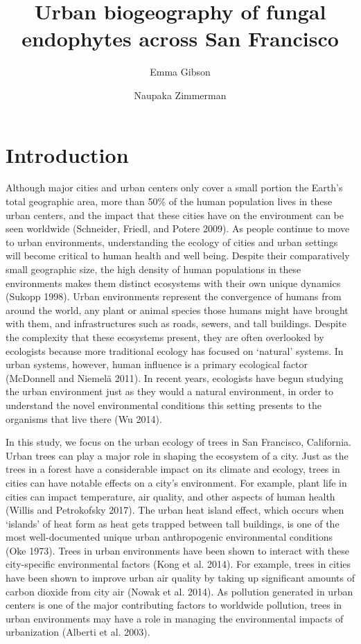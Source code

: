\documentclass[fleqn,10pt,lineno]{wlpeerj} %
\title{Urban biogeography of fungal endophytes across San Francisco}
\author[1]{Emma Gibson}
\author[2]{Naupaka Zimmerman}
\affil[1]{Department of Biology, University of San Francisco}
\affil[2]{Department of Biology, University of San Francisco}
\begin{document}
\flushbottom
\maketitle
\thispagestyle{empty}

\hypertarget{introduction}{%
\section*{Introduction}\label{introduction}}

Although major cities and urban centers only cover a small portion the Earth's total geographic area, more than 50\% of the human population lives in these urban centers, and the impact that these cities have on the environment can be seen worldwide (Schneider, Friedl, and Potere 2009). As people continue to move to urban environments, understanding the ecology of cities and urban settings will become critical to human health and well being. Despite their comparatively small geographic size, the high density of human populations in these environments makes them distinct ecosystems with their own unique dynamics (Sukopp 1998). Urban environments represent the convergence of humans from around the world, any plant or animal species those humans might have brought with them, and infrastructures such as roads, sewers, and tall buildings. Despite the complexity that these ecosystems present, they are often overlooked by ecologists because more traditional ecology has focused on `natural' systems. In urban systems, however, human influence is a primary ecological factor (McDonnell and Niemelä 2011). In recent years, ecologists have begun studying the urban environment just as they would a natural environment, in order to understand the novel environmental conditions this setting presents to the organisms that live there (Wu 2014).

In this study, we focus on the urban ecology of trees in San Francisco, California. Urban trees can play a major role in shaping the ecosystem of a city. Just as the trees in a forest have a considerable impact on its climate and ecology, trees in cities can have notable effects on a city's environment. For example, plant life in cities can impact temperature, air quality, and other aspects of human health (Willis and Petrokofsky 2017). The urban heat island effect, which occurs when `islands' of heat form as heat gets trapped between tall buildings, is one of the most well-documented unique urban anthropogenic environmental conditions (Oke 1973). Trees in urban environments have been shown to interact with these city-specific environmental factors (Kong et al. 2014). For example, trees in cities have been shown to improve urban air quality by taking up significant amounts of carbon dioxide from city air (Nowak et al. 2014). As pollution generated in urban centers is one of the major contributing factors to worldwide pollution, trees in urban environments may have a role in managing the environmental impacts of urbanization (Alberti et al. 2003).
\end{document}
